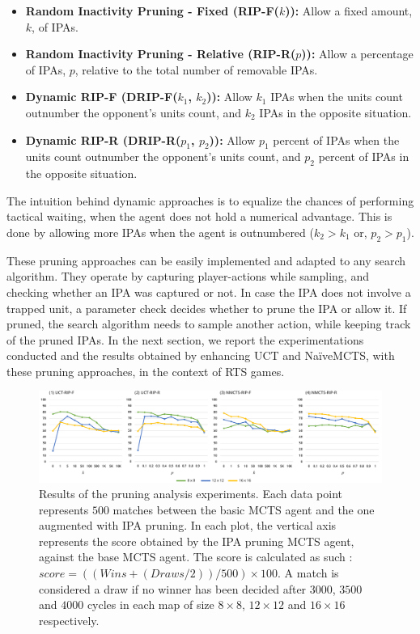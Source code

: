 \documentclass[conference]{IEEEtran}
\begin{document}
\begin{itemize}
\item \textbf{Random Inactivity Pruning - Fixed (RIP-F($k$)):} Allow a fixed amount, $k$, of IPAs.
\item \textbf{Random Inactivity Pruning - Relative (RIP-R($p$)):} Allow a percentage of IPAs, $p$, relative to the total number of removable IPAs.
\item \textbf{Dynamic RIP-F (DRIP-F($k_1$, $k_2$)):} Allow $k_1$ IPAs when the units count outnumber the opponent's units count, and $k_2$ IPAs in the opposite situation.
\item \textbf{Dynamic RIP-R (DRIP-R($p_1$, $p_2$)):} Allow $p_1$ percent of IPAs when the units count outnumber the opponent's units count, and $p_2$ percent of IPAs in the opposite situation.
\end{itemize}

The intuition behind dynamic approaches is to equalize the chances of performing tactical waiting, when the agent does not hold a numerical advantage. This is done by allowing more IPAs when the agent is outnumbered ($k_2 > k_1$ or, $p_2 > p_1$).

These pruning approaches can be easily implemented and adapted to any search algorithm. They operate by capturing player-actions while sampling, and checking whether an IPA was captured or not. In case the IPA does not involve a trapped unit, a parameter check decides whether to prune the IPA or allow it. If pruned, the search algorithm needs to sample another action, while keeping track of the pruned IPAs. In the next section, we report the experimentations conducted and the results obtained by enhancing UCT and NaïveMCTS, with these pruning approaches, in the context of RTS games.


\begin{figure}[!h]
\begin{center}
	\includegraphics[width=1\textwidth]{figs/PT-h.pdf}
	\caption{Results of the pruning analysis experiments. Each data point represents $500$ matches between the basic MCTS agent and the one augmented with IPA pruning. In each plot, the vertical axis represents the score obtained by the IPA pruning MCTS agent, against the base MCTS agent. The score is calculated as such : $score = ((Wins + (Draws / 2)) / 500) \times 100$. A match is considered a draw if no winner has been decided after $3000$, $3500$ and $4000$ cycles in each map of size $8\times8$, $12\times12$ and $16\times16$ respectively.}
	\label{PruningAnalysis}
\end{center}
\end{figure}
\end{document}
